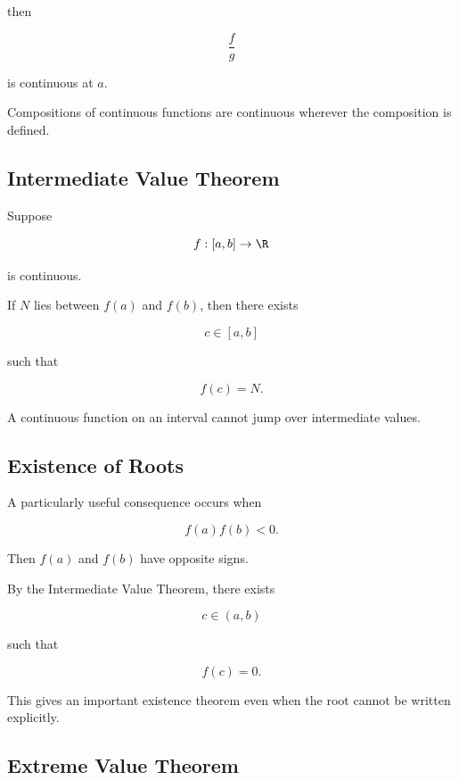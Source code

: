 then

\[
\boxed{
\frac{f}{g}
}
\]

is continuous at \(a\).

Compositions of continuous functions are continuous wherever the
composition is defined.

\subsection{Intermediate Value Theorem}
\label{subsec:intermediate-value-theorem-analysis}

\begin{theorem}
Suppose

\[
f:[a,b]\to\R
\]

is continuous.

If \(N\) lies between \(f(a)\) and \(f(b)\), then there exists

\[
c\in[a,b]
\]

such that

\[
\boxed{
f(c)=N.
}
\]
\end{theorem}

A continuous function on an interval cannot jump over intermediate values.

\subsection{Existence of Roots}
\label{subsec:existence-roots-ivt}

A particularly useful consequence occurs when

\[
f(a)f(b)<0.
\]

Then \(f(a)\) and \(f(b)\) have opposite signs.

By the Intermediate Value Theorem, there exists

\[
c\in(a,b)
\]

such that

\[
\boxed{
f(c)=0.
}
\]

This gives an important existence theorem even when the root cannot be
written explicitly.

\subsection{Extreme Value Theorem}
\label{subsec:extreme-value-theorem-analysis}

